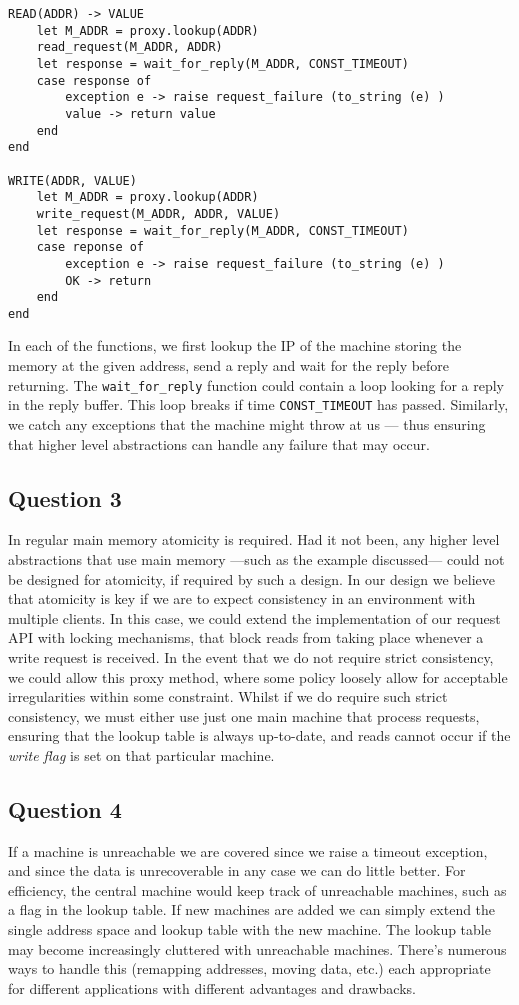 \begin{lstlisting}
READ(ADDR) -> VALUE
    let M_ADDR = proxy.lookup(ADDR)
    read_request(M_ADDR, ADDR)
    let response = wait_for_reply(M_ADDR, CONST_TIMEOUT)
    case response of
        exception e -> raise request_failure (to_string (e) )
        value -> return value
    end
end

WRITE(ADDR, VALUE)
    let M_ADDR = proxy.lookup(ADDR)
    write_request(M_ADDR, ADDR, VALUE)
    let response = wait_for_reply(M_ADDR, CONST_TIMEOUT)
    case reponse of
        exception e -> raise request_failure (to_string (e) )
        OK -> return
    end
end
\end{lstlisting}

In each of the functions, we first lookup the IP of the machine storing the memory at the given address, send a reply and wait for the reply before returning. The {\tt wait\_for\_reply} function could contain a loop looking for a reply in the reply buffer. This loop breaks if time {\tt CONST\_TIMEOUT} has passed. Similarly, we catch any exceptions that the machine might throw at us --- thus ensuring that higher level abstractions can handle any failure that may occur.

\subsection{Question 3}

In regular main memory atomicity is required. Had it not been, any higher level abstractions that use main memory ---such as the example discussed--- could not be designed for atomicity, if required by such a design. In our design we believe that atomicity is key if we are to expect consistency in an environment with multiple clients. In this case, we could extend the implementation of our request API with locking mechanisms, that block reads from taking place whenever a write request is received. In the event that we do not require strict consistency, we could allow this proxy method, where some policy loosely allow for acceptable irregularities within some constraint. Whilst if we do require such strict consistency, we must either use just one main machine that process requests, ensuring that the lookup table is always up-to-date, and reads cannot occur if the {\it write flag} is set on that particular machine.

\subsection{Question 4}

If a machine is unreachable we are covered since we raise a timeout exception, and since the data is unrecoverable in any case we can do little better. For efficiency, the central machine would keep track of unreachable machines, such as a flag in the lookup table. If new machines are added we can simply extend the single address space and lookup table with the new machine. The lookup table may become increasingly cluttered with unreachable machines. There's numerous ways to handle this (remapping addresses, moving data, etc.) each appropriate for different applications with different advantages and drawbacks.


